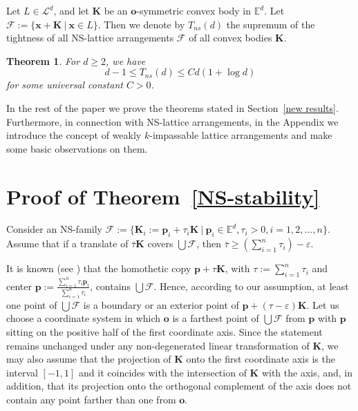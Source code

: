 \documentclass[12pt]{article}
\newtheorem{thm}{Theorem}
\newcommand{\xx}{\mathbf{x}}
\newcommand{\KK}{\mathbf K}
\newcommand{\Ee}{{\mathbb E}}
\newcommand{\Ed}{\Ee^d}
\newcommand{\F}{\mathcal{F}}
\newcommand{\p}{\mathbf{p}}
\renewcommand{\o}{\mathbf{o}}
\begin{document}
Let $L\in\mathcal{L}^d$, and let $\KK$ be an $\mathbf{o}$-symmetric convex body in $\Ed$. Let $\F := \{ \xx+ \KK \  | \ \xx \in L \}$. Then we denote by $T_{ns}(d)$ the supremum of the tightness of all NS-lattice arrangements $\F$ of all convex bodies $\KK$. 

\begin{thm}\label{tightness estimates}
For $d\geq 2$, we have
\[
d-1 \leq T_{ns}(d) \leq C d(1+\log d)
\]
for some universal constant $C > 0$.
\end{thm}

In the rest of the paper we prove the theorems stated in Section~\ref{new results}. Furthermore, in connection with NS-lattice arrangements, in the Appendix  we introduce the concept of weakly $k$-impassable lattice arrangements and make some basic observations on them.

\section{Proof of Theorem~\ref{NS-stability}}


Consider an NS-family $\mathcal{F}:= \{ \KK_i := \p_i + \tau_i \KK \ |\  \p_i\in \Ee^d, \tau_i>0, i=1,2,\ldots, n\}$. Assume that if a translate of $\bar{\tau} \KK$ covers $\bigcup \mathcal{F}$, then $\bar{\tau} \geq \left(\sum_{i=1}^n \tau_i\right) - \varepsilon$.

It is known (see \cite{BezLan16}) that the homothetic copy $\p + \tau \KK$, with $\tau := \sum_{i=1}^n \tau_i $ and center $\p:= \frac{\sum_{i=1}^n \tau_i \p_i}{ \sum_{i=1}^n \tau_i}$, contains $\bigcup \mathcal{F}$. Hence, according to our assumption, at least one point of $\bigcup \mathcal{F}$  is a boundary or an exterior point of $\p + (\tau-\varepsilon) \KK$. Let us choose a coordinate system in which $\o$ is a farthest point of $\bigcup \mathcal{F}$ from $\p$ with $\p$ sitting on the positive half of the first coordinate axis. Since the statement remains unchanged under any non-degenerated linear transformation of $\KK$, we may also assume that the projection of $\KK$ onto the first coordinate axis is the interval $[-1,1]$ and it coincides with the intersection of $\KK$ with the axis, and, in addition, that its projection onto the orthogonal complement of the axis does not contain any point farther than one from $\o$.
\end{document}
